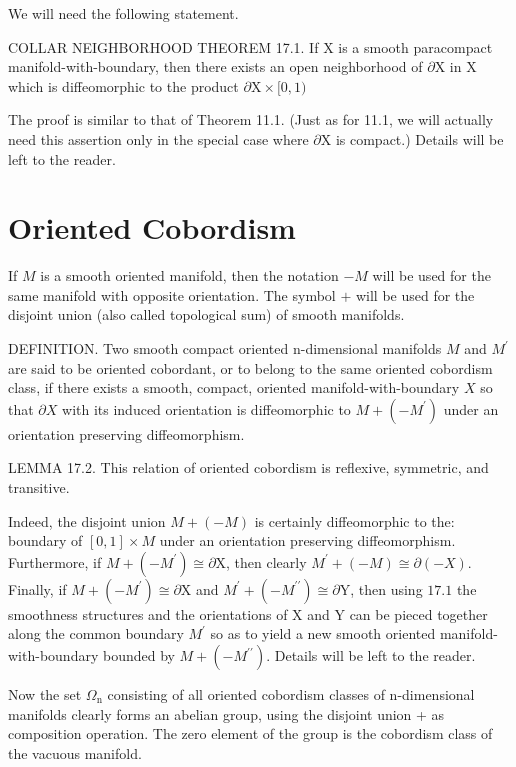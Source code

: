 \documentclass[10pt]{article}
\begin{document}
We will need the following statement.

COLLAR NEIGHBORHOOD THEOREM 17.1. If $\mathrm{X}$ is a smooth paracompact manifold-with-boundary, then there exists an open neighborhood of $\partial \mathrm{X}$ in $\mathrm{X}$ which is diffeomorphic to the product $\partial \mathrm{X} \times[0,1)$

The proof is similar to that of Theorem 11.1. (Just as for 11.1, we will actually need this assertion only in the special case where $\partial \mathrm{X}$ is compact.) Details will be left to the reader.

\section{Oriented Cobordism}
If $M$ is a smooth oriented manifold, then the notation $-M$ will be used for the same manifold with opposite orientation. The symbol $+$ will be used for the disjoint union (also called topological sum) of smooth manifolds.

DEFINITION. Two smooth compact oriented n-dimensional manifolds $M$ and $M^{\prime}$ are said to be oriented cobordant, or to belong to the same oriented cobordism class, if there exists a smooth, compact, oriented manifold-with-boundary $X$ so that $\partial X$ with its induced orientation is diffeomorphic to $M+\left(-M^{\prime}\right)$ under an orientation preserving diffeomorphism.

LEMMA 17.2. This relation of oriented cobordism is reflexive, symmetric, and transitive.

Indeed, the disjoint union $M+(-M)$ is certainly diffeomorphic to the: boundary of $[0,1] \times M$ under an orientation preserving diffeomorphism. Furthermore, if $M+\left(-M^{\prime}\right) \cong \partial \mathrm{X}$, then clearly $M^{\prime}+(-M) \cong \partial(-X)$. Finally, if $M+\left(-M^{\prime}\right) \cong \partial \mathrm{X}$ and $M^{\prime}+\left(-M^{\prime \prime}\right) \cong \partial \mathrm{Y}$, then using $17.1$ the smoothness structures and the orientations of $\mathrm{X}$ and $\mathrm{Y}$ can be pieced together along the common boundary $M^{\prime}$ so as to yield a new smooth oriented manifold-with-boundary bounded by $M+\left(-M^{\prime \prime}\right)$. Details will be left to the reader.

Now the set $\Omega_{\mathrm{n}}$ consisting of all oriented cobordism classes of n-dimensional manifolds clearly forms an abelian group, using the disjoint union + as composition operation. The zero element of the group is the cobordism class of the vacuous manifold.
\end{document}
